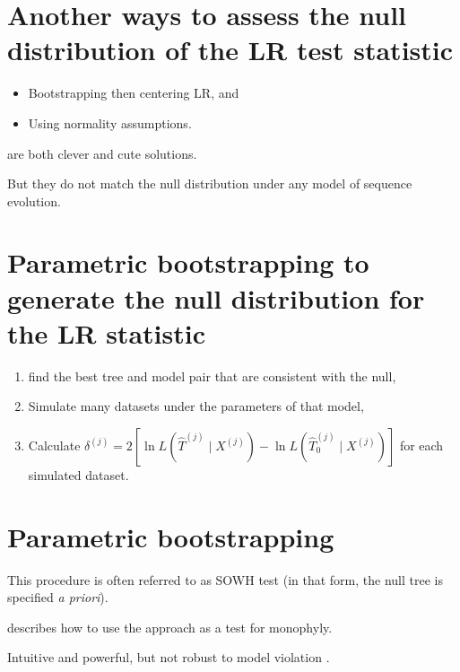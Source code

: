 \documentclass[landscape]{foils}
\begin{document}
\myNewSlide
\section*{Another ways to assess the null distribution of the LR test statistic}
\begin{itemize}
	\item Bootstrapping then centering LR, and 
	\item Using normality assumptions.
\end{itemize}
are both clever and cute solutions.

But they do not match the null distribution under any model of sequence evolution.

\myNewSlide
\section*{Parametric bootstrapping to generate the null distribution for the LR statistic}
\begin{enumerate}
	\item find the best tree and model pair that are consistent with the null,
	\item Simulate many datasets under the parameters of that model,
	\item Calculate $\delta^{(j)} = 2\left[\ln L (\hat{T}^{(j)} \mid  X^{(j)}) - \ln L (\hat{T}_{0}^{(j)} \mid  X^{(j)})\right]$ for each simulated dataset.
\end{enumerate}

\myNewSlide
\section*{Parametric bootstrapping}
This procedure is often referred to as SOWH test (in that form, the null tree is specified {\em a priori}).

\citet{HuelsenbeckHN1996} describes how to use the approach as a test for monophyly.

Intuitive and powerful, but not robust to model violation \citep{Buckley2002}.

\myNewSlide
 
\end{document}
